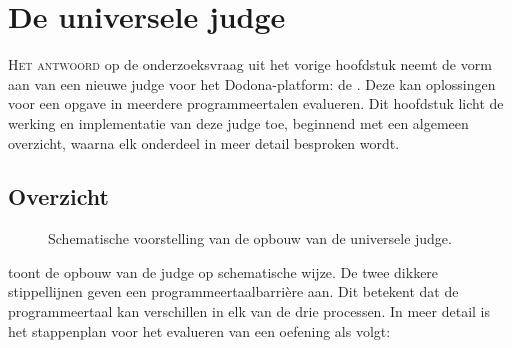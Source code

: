 \chapter{De universele judge}\label{ch:de-universele-judge}

\lettrine{H}{et antwoord} op de onderzoeksvraag uit het vorige hoofdstuk neemt de vorm aan van een nieuwe judge voor het Dodona-platform: de .
Deze kan oplossingen voor een opgave in meerdere programmeertalen evalueren.
Dit hoofdstuk licht de werking en implementatie van deze judge toe, beginnend met een algemeen overzicht, waarna elk onderdeel in meer detail besproken wordt.

\section{Overzicht}\label{sec:overzicht}

\begin{figure}
    \begin{adjustbox}{width=\textwidth}
        
    \end{adjustbox}
    \caption{Schematische voorstelling van de opbouw van de universele judge.}
    \label{fig:universal-judge}
\end{figure}

 toont de opbouw van de judge op schematische wijze.
De twee dikkere stippellijnen geven een programmeertaalbarrière aan.
Dit betekent dat de programmeertaal kan verschillen in elk van de drie processen.
In meer detail is het stappenplan voor het evalueren van een oefening als volgt:

